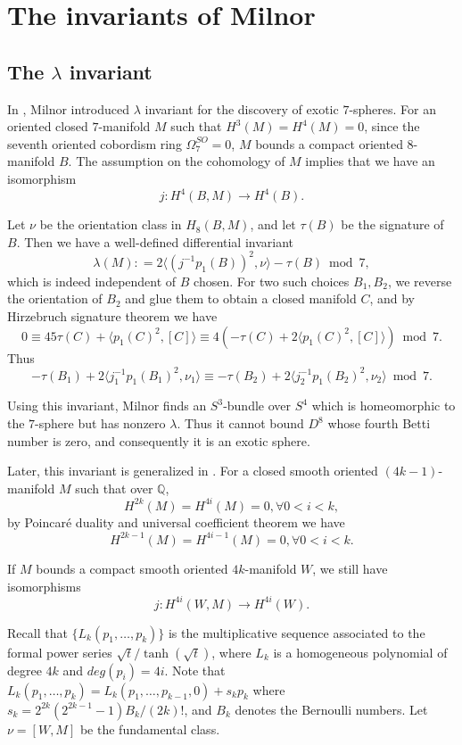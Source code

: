 \documentclass[twoside]{article}
\begin{document}
\section{The invariants of Milnor}

\subsection{The \texorpdfstring{$\lambda$}{lambda} invariant}

In \cite{milnor7sphere}, Milnor introduced $\lambda$ invariant for the discovery of exotic $7$-spheres. For an oriented closed $7$-manifold $M$ such that $H^3(M) = H^4(M) = 0$, since the seventh oriented cobordism ring $\Omega_7^{SO} = 0$, $M$ bounds a compact oriented $8$-manifold $B$. The assumption on the cohomology of $M$ implies that we have an isomorphism
\[
j \colon H^4(B,M) \to  H^4(B). 
\]

Let $\nu$ be the orientation class in $H_8(B,M)$, and let $\tau(B)$ be the signature of $B$. Then we have a well-defined differential invariant 
\[
\lambda(M) \colon  = 2\langle (j^{-1}p_1(B))^2, \nu\rangle -\tau(B)  \bmod  7, 
\]
which is indeed independent of $B$ chosen. For two such choices $B_1, B_2$, we reverse the orientation of $B_2$ and glue them to obtain a closed manifold $C$, and by Hirzebruch signature theorem we have 
\[
0 \equiv  45\tau(C) + \langle p_1(C)^2, [C]\rangle \equiv  4(-\tau(C) + 2\langle p_1(C)^2, [C]\rangle)  \bmod  7. 
\]
Thus 
\[
-\tau(B_1) + 2\langle j^{-1}_1p_1(B_1)^2, \nu_1 \rangle \equiv  -\tau(B_2) + 2\langle j^{-1}_2p_1(B_2)^2, \nu_2\rangle  \bmod  7. 
\]

Using this invariant, Milnor finds an $S^3$-bundle over $S^4$ which is homeomorphic to the $7$-sphere but has nonzero $\lambda$. Thus it cannot bound $D^8$ whose fourth Betti number is zero, and consequently it is an exotic sphere. 

Later, this invariant is generalized in \cite{milnorspheres}. For a closed smooth oriented $(4k-1)$-manifold $M$ such that over $\mathbb{Q}$, 
\[
H^{2k}(M) = H^{4i}(M) = 0, \forall 0 < i < k, 
\]
by Poincar\'e duality and universal coefficient theorem we have
\[
H^{2k-1}(M) = H^{4i-1}(M) = 0, \forall 0 < i < k. 
\]

If $M$ bounds a compact smooth oriented $4k$-manifold $W$, we still have isomorphisms
\[
j \colon H^{4i}(W,M) \to  H^{4i}(W). 
\]

Recall that $ \{ L_k(p_1, \dots  ,p_k) \} $ is the multiplicative sequence associated to the formal power series ${\sqrt{t}}/{\operatorname{tanh}(\sqrt{t})}$, where $L_k$ is a homogeneous polynomial of degree $4k$ and $deg(p_i) = 4i$. Note that $L_k(p_1, \dots  ,p_k) = L_k(p_1, \dots  ,p_{k-1},0) + s_kp_k$ where $s_{k} = 2^{2 k}(2^{2 k-1}-1) B_{k} /(2 k) !$, and $B_{k}$ denotes the Bernoulli numbers. Let $\nu = [W,M]$ be the fundamental class. 
\end{document}

